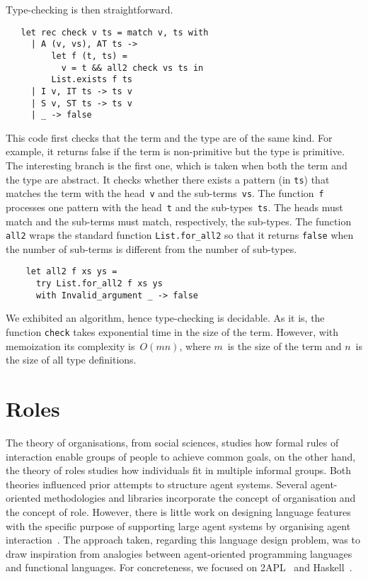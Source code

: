 \documentclass[a4paper,12pt,oneside,fleqn]{book} %
\newcommand{\rg}[1]{\marginpar{\tiny\raggedright\textcolor{blue}{\bf rg:} #1}}
\begin{document}
Type-checking is then straightforward.
\begin{verbatim}
   let rec check v ts = match v, ts with
     | A (v, vs), AT ts ->
         let f (t, ts) =
           v = t && all2 check vs ts in
         List.exists f ts
     | I v, IT ts -> ts v
     | S v, ST ts -> ts v
     | _ -> false
\end{verbatim}
This code first checks that the term and the type are of the same kind. For
example, it returns false if the term is non-primitive but the type is
primitive. The interesting branch is the first one, which is taken when
both the term and the type are abstract. It checks whether there exists a
pattern (in \verb|ts|) that matches the term with the head~\verb|v| and the
sub-terms~\verb|vs|. The function~\verb|f| processes one pattern with the
head~\verb|t| and the sub-types~\verb|ts|. The heads must match and the
sub-terms must match, respectively, the sub-types. The function \verb|all2|
wraps the standard function \verb|List.for_all2| so that it returns
\verb|false| when the number of sub-terms is different from the number of
sub-types.
\begin{verbatim}
    let all2 f xs ys =
      try List.for_all2 f xs ys
      with Invalid_argument _ -> false
\end{verbatim}

We exhibited an algorithm, hence type-checking is decidable. As it is, the
function \verb|check| takes exponential time in the size of the term.
However, with memoization its complexity is~$O(mn)$, where $m$~is the
size of the term and $n$~is the size of all type definitions.
\rg{Maybe expand a bit here, with some example?}

\section{Roles} %

The theory of organisations, from social sciences, studies how formal rules
of interaction enable groups of people to achieve common goals, on the
other hand, the theory of roles studies how individuals fit in multiple
informal groups. Both theories influenced prior attempts to structure agent
systems. Several agent-oriented methodologies and libraries incorporate the
concept of organisation and the concept of role.  However, there is little
work on designing language features with the specific purpose of supporting
large agent systems by organising agent
interaction~\cite{collier2005,DBLP:journals/entcs/BaldoniBT06,DBLP:conf/oopsla/RicciS11}.
The approach taken, regarding this language design problem, was to draw
inspiration from analogies between agent-oriented programming languages and
functional languages. For concreteness, we focused on
2APL~\cite{DBLP:journals/aamas/Dastani08} and Haskell~\cite{web:haskell}.
\end{document}
